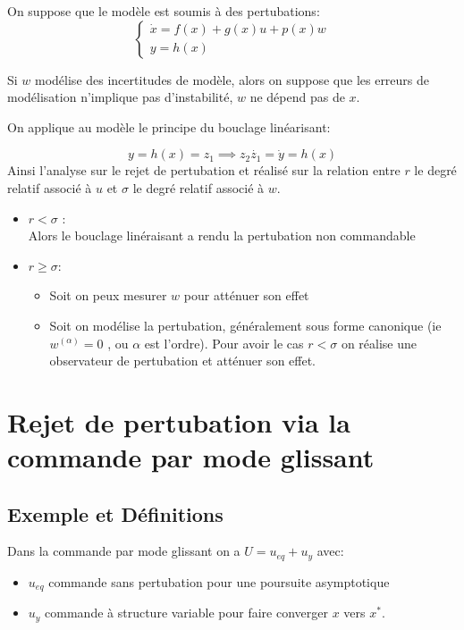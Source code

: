 \documentclass[main.tex]{subfiles}
\begin{document}
On suppose que le modèle est soumis à des pertubations:
\[
  \begin{cases}
    \dot{x} = f(x) +g(x)u+p(x)w\\
    y = h(x)
  \end{cases}
\]
\begin{rem}
  Si $w$ modélise des incertitudes de modèle, alors on suppose que les erreurs de modélisation n'implique pas d'instabilité, $w$ ne dépend pas de $x$.
\end{rem}

On applique au modèle le principe du bouclage linéarisant:

\[
  y=h(x)=z_1\implies z_2\dot{z_1} = \dot{y} =h(x)
\]
Ainsi l'analyse sur le rejet de pertubation et réalisé sur la relation entre $r$ le degré relatif associé à $u$ et $\sigma$ le degré relatif associé à $w$.

\begin{itemize}
\item $r < \sigma$ : \\
  Alors le bouclage linéraisant a rendu la pertubation non commandable
\item $r \ge \sigma$:\\
  \begin{itemize}
  \item Soit on peux mesurer $w$ pour atténuer son effet
  \item Soit on modélise la pertubation, généralement sous forme canonique (ie $w^{(\alpha)}= 0$ , ou $\alpha$ est l'ordre). Pour avoir le cas $r<\sigma$ on réalise une observateur de pertubation et atténuer son effet.
\end{itemize}
\end{itemize}


\section{Rejet de pertubation via la commande par mode glissant}
\subsection{Exemple et Définitions}

Dans la commande par mode glissant on a $U = u_{eq}+u_y$ avec:
\begin{itemize}
\item $u_{eq}$ commande sans pertubation pour une poursuite asymptotique
\item $u_y$ commande à structure variable pour faire converger $x$ vers $x^*$.
\end{itemize}
\end{document}
